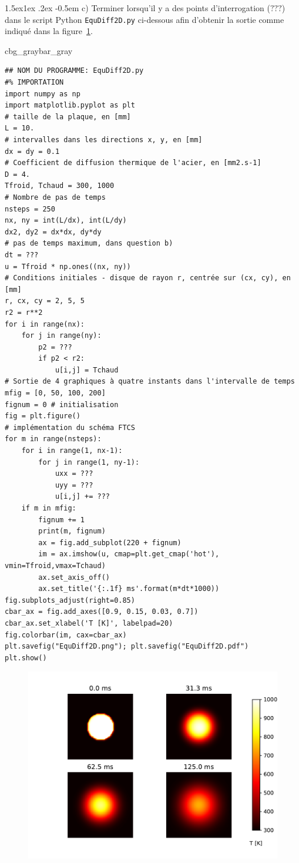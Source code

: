 \documentclass[%
oneside,                 %
final,                   %
10pt,french]{article}
\makeatletter
\newenvironment{_pro_tight}[2]{
   \def\FrameCommand{\color{#2}\vrule width 1mm\normalcolor\colorbox{#1}}
   \FrameRule0.6pt\MakeFramed {\advance\hsize-2mm\FrameRestore}\vskip3mm}
   {\vskip0mm\endMakeFramed}
\newenvironment{pro}[2]{
\bgroup\rmfamily
\fboxsep=0mm\relax
\begin{_pro_tight}{#1}{#2}
\list{}{\parsep=-2mm\parskip=0mm\topsep=0pt\leftmargin=2mm
\rightmargin=2\leftmargin\leftmargin=4pt\relax}
\item\relax}
{\endlist\end{_pro_tight}\egroup}
\newenvironment{doconceexercise}{}{}
\newcommand\subex{\@startsection{paragraph}{4}{\z@}%
                  {1.5ex\@plus1ex \@minus.2ex}%
                  {-0.5em}%
                  {\normalfont\normalsize\bfseries}}
\makeatother
\begin{document}
\begin{doconceexercise}

\subex{c)}
Terminer lorsqu'il y a des points d'interrogation ($???$) dans le script Python \texttt{EquDiff2D.py} ci-dessous afin d'obtenir la sortie comme indiqué dans la figure~\ref{fig:EquDiff2D}.
\begin{pro}{cbg_gray}{bar_gray}\begin{verbatim}
## NOM DU PROGRAMME: EquDiff2D.py
#% IMPORTATION
import numpy as np
import matplotlib.pyplot as plt
# taille de la plaque, en [mm]
L = 10.
# intervalles dans les directions x, y, en [mm]
dx = dy = 0.1
# Coefficient de diffusion thermique de l'acier, en [mm2.s-1]
D = 4.
Tfroid, Tchaud = 300, 1000
# Nombre de pas de temps
nsteps = 250
nx, ny = int(L/dx), int(L/dy)
dx2, dy2 = dx*dx, dy*dy
# pas de temps maximum, dans question b)
dt = ???
u = Tfroid * np.ones((nx, ny))
# Conditions initiales - disque de rayon r, centrée sur (cx, cy), en [mm]
r, cx, cy = 2, 5, 5
r2 = r**2
for i in range(nx):
    for j in range(ny):
        p2 = ???
        if p2 < r2:
            u[i,j] = Tchaud
# Sortie de 4 graphiques à quatre instants dans l'intervalle de temps
mfig = [0, 50, 100, 200]
fignum = 0 # initialisation
fig = plt.figure()
# implémentation du schéma FTCS
for m in range(nsteps):
    for i in range(1, nx-1):
        for j in range(1, ny-1):
            uxx = ???
            uyy = ???
            u[i,j] += ???
    if m in mfig:
        fignum += 1
        print(m, fignum)
        ax = fig.add_subplot(220 + fignum)
        im = ax.imshow(u, cmap=plt.get_cmap('hot'), vmin=Tfroid,vmax=Tchaud)
        ax.set_axis_off()
        ax.set_title('{:.1f} ms'.format(m*dt*1000))
fig.subplots_adjust(right=0.85)
cbar_ax = fig.add_axes([0.9, 0.15, 0.03, 0.7])
cbar_ax.set_xlabel('T [K]', labelpad=20)
fig.colorbar(im, cax=cbar_ax)
plt.savefig("EquDiff2D.png"); plt.savefig("EquDiff2D.pdf")
plt.show()
\end{verbatim}
\end{pro}
\noindent


\begin{figure}[!ht]  %
  \centerline{\includegraphics[width=0.8\linewidth]{scripts/EquDiff2D.pdf}}
  \caption{
  \label{fig:EquDiff2D}
  }
\end{figure}


\end{doconceexercise}
\end{document}
